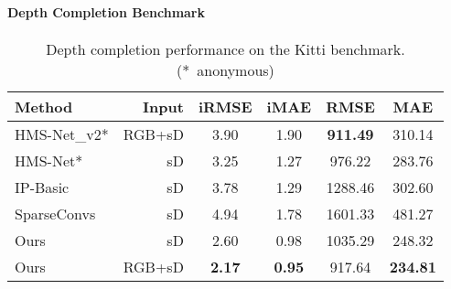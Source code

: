 \documentclass[10pt,twocolumn,letterpaper]{article}
\begin{document}
\paragraph{Depth Completion Benchmark}
\begin{table}
	\centering
	\scriptsize
	\begin{tabular}{lrcccc}
		Method & Input & iRMSE & iMAE & RMSE & MAE \\
		\toprule
		HMS-Net\_v2* & RGB+sD & 3.90 & 1.90 & \bf{911.49} & 310.14 \\
		HMS-Net* & sD & 3.25 & 1.27 & 976.22 & 283.76 \\
		IP-Basic \cite{ku2018defense} & sD & 3.78 & 1.29 & 1288.46 & 302.60 \\
		SparseConvs \cite{uhrig2017sparsity} & sD & 4.94 & 1.78 & 1601.33 & 481.27 \\
		\midrule
		Ours & sD & 2.60 & 0.98 & 1035.29 & 248.32 \\
		Ours & RGB+sD & \bf{2.17} & \bf{0.95} & 917.64 & \bf{234.81} \\
	\end{tabular}
	\caption{Depth completion performance on the Kitti benchmark. (*~anonymous)}
	\label{tab:depthCompletionKitti}
\end{table}
\end{document}
